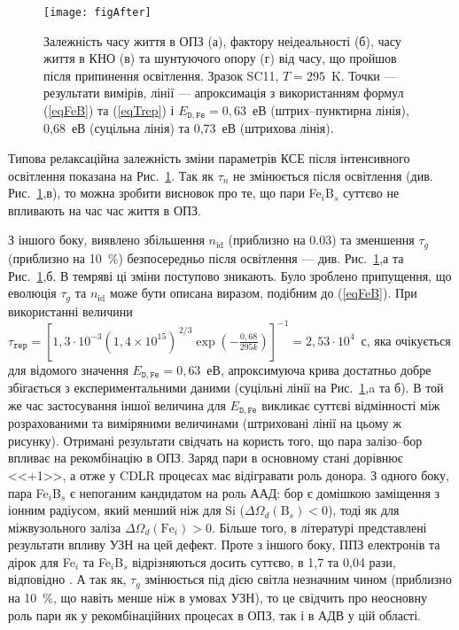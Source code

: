 \begin{figure}
\center
\texttt{[image: figAfter]}
\caption{\label{figAfter}
Залежність часу життя в ОПЗ (а),  фактору неідеальності (б), часу життя в КНО (в) та шунтуючого опору (г) від часу, що пройшов
після припинення освітлення.
Зразок SC11, $T=295$~K.
Точки --- результати вимірів,
лінії --- апроксимація з використанням формул (\ref{eqFeB}) та (\ref{eqTrep})
і $E_{\mathtt{D,Fe}}=0,63$~еВ (штрих--пунктирна лінія), 0,68~еВ (суцільна лінія) та 0,73~еВ (штрихова лінія).
}%
\end{figure}

Типова релаксаційна залежність зміни параметрів КСЕ після інтенсивного освітлення показана на Рис.~\ref{figAfter}.
Так як $\tau_n$ не змінюється після освітлення (див. Рис.~\ref{figAfter},в), то можна зробити висновок про те, що
пари Fe$_i$B$_s$ суттєво не впливають на час час життя в ОПЗ.

З іншого боку, виявлено збільшення $n_{\mathrm{id}}$ (приблизно на 0.03) та зменшення $\tau_g$ (приблизно на 10~\%) безпосередньо після освітлення
--- див. Рис.~\ref{figAfter},а та Рис.~\ref{figAfter},б.
В темряві ці зміни поступово зникають.
Було зроблено припущення, що еволюція $\tau_g$ та $n_{\mathrm{id}}$ може бути описана виразом, подібним до (\ref{eqFeB}).
При використанні величини $\tau_{\mathtt{rep}}=\left[1,3\cdot10^{-3}(1,4\times10^{15})^{\,2/3}\exp\left(-\frac{0,68}{295k}\right)\right]^{-1}=2,53\cdot10^4$~с,
яка очікується для відомого значення $E_{\mathtt{D,Fe}}=0,63$~еВ, апроксимуюча крива достатньо добре збігається з експериментальними даними
(суцільні лінії на Рис.~\ref{figAfter},a та б).
В той же час застосування іншої величина для $E_{\mathtt{D,Fe}}$ викликає суттєві відмінності між розрахованими та виміряними величинами
(штриховані лінії на цьому ж рисунку).
Отримані результати свідчать на користь того, що пара залізо--бор впливає
на рекомбінацію в ОПЗ.
Заряд пари в основному стані дорівнює <<+1>>, а отже у CDLR процесах має відігравати роль донора.
З одного боку, пара Fe$_i$B$_s$ є непоганим кандидатом на роль ААД:
бор є домішкою заміщення з іонним радіусом, який менший ніж для Si ($\Delta\Omega_d (\mbox{B}_s)<0$),
тоді як для міжвузольного заліза $\Delta\Omega_d (\mbox{Fe}_i)>0$.
Більше того,  в літературі \cite{Ostapenko1995,OlikhFTT} представлені результати впливу УЗН на цей дефект.
Проте з іншого боку, ППЗ електронів та дірок для Fe$_i$ та Fe$_i$B$_s$ відрізняються досить суттєво, в 1,7 та 0,04 рази, відповідно \cite{MurphyJAP2011}.
А так як, $\tau_g$ змінюється під дією світла незначним чином (приблизно на 10~\%, що навіть менше ніж в умовах УЗН), то це свідчить про
неосновну роль пари як у рекомбінаційних процесах в ОПЗ, так і в АДВ у цій області.


